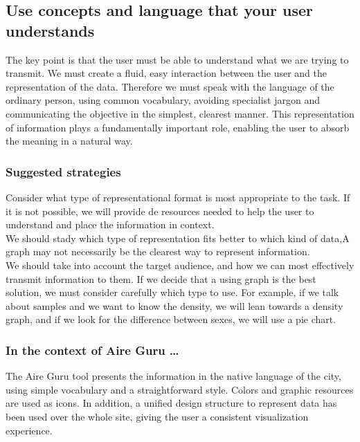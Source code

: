 \subsection{Use concepts and language that your user understands}

The key point is that the user must be able to understand what we are trying to transmit. We must create a fluid, 
easy interaction between the user and the representation of the data. Therefore we must speak with the language of 
the ordinary person, using common vocabulary, avoiding specialist jargon and communicating the objective in the simplest, 
clearest manner. This representation of information plays a fundamentally important role, enabling the user to absorb 
the meaning in a natural way.

\subsubsection*{Suggested strategies} 

Consider what type of representational format is most appropriate to the task. If it is not possible, we will provide de 
resources needed to help the user to understand and place the information in context. \\

We should stady which type of representation fits better to which kind of data,A graph may not necessarily be the 
clearest way to represent information.\\

We should take into account the target audience, and how we can most effectively transmit information to them. 
If we decide that a using graph is the best solution, we must consider carefully which type to use. For example, 
if we talk about samples and we want to know the density, we will lean towards a density graph, and if we look for the difference
between sexes, we will use a pie chart.

\subsubsection*{In the context of Aire Guru \ldots} 

The Aire Guru tool presents the information in the native language of the city, using simple vocabulary and a 
straightforward style. Colors and graphic resources are used as icons. In addition, a unified design structure to represent data has 
been used over the whole site, giving the user a consistent visualization experience. \\

